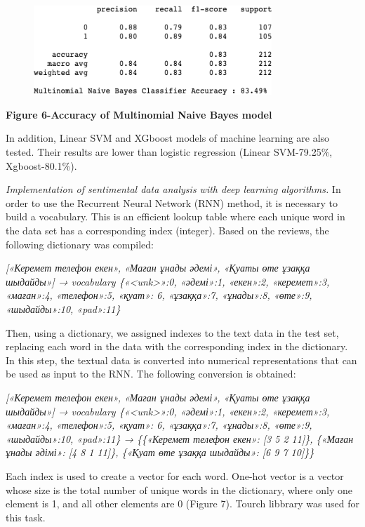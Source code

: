 \begin{figure}[H]
	\centering
	\includegraphics[width=0.8\textwidth]{media/ict/image13}
	\caption*{}
\end{figure}


{\bfseries Figure 6-Accuracy of Multinomial Naive Bayes model}

In addition, Linear SVM and XGboost models of machine learning are also
tested. Their results are lower than logistic regression (Linear
SVM-79.25\%, Xgboost-80.1\%).

\emph{Implementation of sentimental data analysis with deep learning
algorithms.} In order to use the Recurrent Neural Network (RNN) method,
it is necessary to build a vocabulary. This is an efficient lookup table
where each unique word in the data set has a corresponding index
(integer). Based on the reviews, the following dictionary was compiled:

\emph{{[}«Керемет телефон екен», «Маған ұнады әдемі», «Қуаты өте ұзаққа
шыдайды»{]} → vocabulary \{«\textless unk\textgreater»:0, «әдемі»:1,
«екен»:2, «керемет»:3, «маған»:4, «телефон»:5, «қуат»: 6, «ұзаққа»:7,
«ұнады»:8, «өте»:9, «шыдайды»:10, «pad»:11\}}

Then, using a dictionary, we assigned indexes to the text data in the
test set, replacing each word in the data with the corresponding index
in the dictionary. In this step, the textual data is converted into
numerical representations that can be used as input to the RNN. The
following conversion is obtained:

\emph{{[}«Керемет телефон екен», «Маған ұнады әдемі», «Қуаты өте ұзаққа
шыдайды»{]} → vocabulary \{«\textless unk\textgreater»:0, «әдемі»:1,
«екен»:2, «керемет»:3, «маған»:4, «телефон»:5, «қуат»: 6, «ұзаққа»:7,
«ұнады»:8, «өте»:9, «шыдайды»:10, «pad»:11\} → \{\{«Керемет телефон
екен»: {[}3 5 2 11{]}\}, \{«Маған ұнады әдімі»: {[}4 8 1 11{]}\},
\{«Қуат өте ұзаққа шыдайды»: {[}6 9 7 10{]}\}\}}

Each index is used to create a vector for each word. One-hot vector is a
vector whose size is the total number of unique words in the dictionary,
where only one element is 1, and all other elements are 0 (Figure 7).
Tourch libbrary was used for this task.

